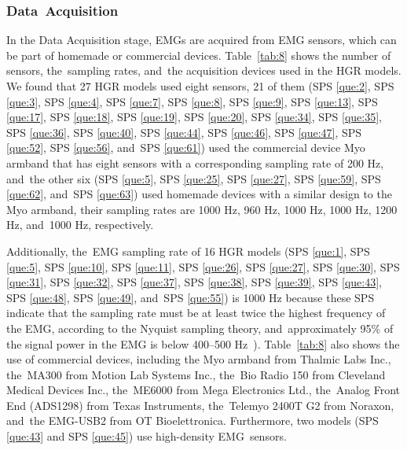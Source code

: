 \documentclass[sensors,review,accept,moreauthors,pdftex]{Definitions/mdpi}
\begin{document}
\begin{table}[H]
		
	
		
		


	
\end{table}








\subsubsection{Data~Acquisition} \label{acqui}


In the Data Acquisition stage, EMGs are acquired from EMG sensors, which can be part of homemade or commercial devices. Table~\ref{tab:8} shows the number of sensors, the~sampling rates, and~the acquisition devices used in the HGR models. We found that 27 HGR models used eight sensors, 21 of them (SPS \ref{que:2}, SPS \ref{que:3}, SPS \ref{que:4}, SPS \ref{que:7}, SPS \ref{que:8}, SPS \ref{que:9}, SPS \ref{que:13}, SPS \ref{que:17}, SPS \ref{que:18}, SPS \ref{que:19}, SPS \ref{que:20}, SPS \ref{que:34}, SPS \ref{que:35}, SPS \ref{que:36}, SPS \ref{que:40}, SPS \ref{que:44}, SPS \ref{que:46}, SPS \ref{que:47}, SPS \ref{que:52}, SPS \ref{que:56}, and~SPS \ref{que:61}) used the commercial device Myo armband that has eight sensors with a corresponding sampling rate of 200 Hz, and~the other six (SPS \ref{que:5}, SPS \ref{que:25}, SPS \ref{que:27}, SPS \ref{que:59}, SPS \ref{que:62}, and~SPS \ref{que:63}) used homemade devices with a similar design to the Myo armband, their sampling rates are 1000 Hz, 960 Hz, 1000 Hz, 1000 Hz, 1200 Hz, and~1000 Hz, respectively.

 Additionally, the~EMG sampling rate of 16 HGR models (SPS \ref{que:1}, SPS \ref{que:5}, SPS \ref{que:10}, SPS \ref{que:11}, SPS \ref{que:26}, SPS \ref{que:27}, SPS \ref{que:30}, SPS \ref{que:31}, SPS \ref{que:32}, SPS \ref{que:37}, SPS \ref{que:38}, SPS \ref{que:39}, SPS \ref{que:43}, SPS \ref{que:48}, SPS \ref{que:49}, and~SPS \ref{que:55}) is 1000 Hz because these SPS indicate that the sampling rate must be at least twice the highest frequency of the EMG, according to the Nyquist sampling theory, and~approximately 95\% of the signal power in the EMG is below 400--500 Hz~\cite{Clancy2002,GuanglinLi2010,Winter1990}). 
Table~\ref{tab:8} also shows the use of commercial devices, including the Myo armband from Thalmic Labs Inc., the~MA300 from Motion Lab Systems Inc., the~Bio Radio 150 from Cleveland Medical Devices Inc., the~ME6000 from Mega Electronics Ltd., the~Analog Front End (ADS1298) from Texas Instruments, the~Telemyo 2400T G2 from Noraxon, and~the EMG-USB2 from OT Bioelettronica. Furthermore, two models (SPS \ref{que:43} and SPS \ref{que:45}) use high-density EMG~sensors.
\end{document}
